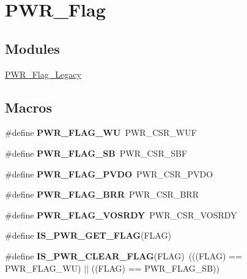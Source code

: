 \hypertarget{group___p_w_r___flag}{\section{P\-W\-R\-\_\-\-Flag}
\label{group___p_w_r___flag}
}
\subsection*{Modules}
\begin{DoxyCompactItemize}
\item 
\hyperlink{group___p_w_r___flag___legacy}{P\-W\-R\-\_\-\-Flag\-\_\-\-Legacy}
\end{DoxyCompactItemize}
\subsection*{Macros}
\begin{DoxyCompactItemize}
\item 
\hypertarget{group___p_w_r___flag_ga2d06760a5769e729b06d41e37036d58e}{\#define {\bfseries P\-W\-R\-\_\-\-F\-L\-A\-G\-\_\-\-W\-U}~P\-W\-R\-\_\-\-C\-S\-R\-\_\-\-W\-U\-F}\label{group___p_w_r___flag_ga2d06760a5769e729b06d41e37036d58e}

\item 
\hypertarget{group___p_w_r___flag_ga9e55f0b5dec2346d5c8dee3ab3c0c2df}{\#define {\bfseries P\-W\-R\-\_\-\-F\-L\-A\-G\-\_\-\-S\-B}~P\-W\-R\-\_\-\-C\-S\-R\-\_\-\-S\-B\-F}\label{group___p_w_r___flag_ga9e55f0b5dec2346d5c8dee3ab3c0c2df}

\item 
\hypertarget{group___p_w_r___flag_gaefd05d58cc050eeef83a1b5c520b2c2a}{\#define {\bfseries P\-W\-R\-\_\-\-F\-L\-A\-G\-\_\-\-P\-V\-D\-O}~P\-W\-R\-\_\-\-C\-S\-R\-\_\-\-P\-V\-D\-O}\label{group___p_w_r___flag_gaefd05d58cc050eeef83a1b5c520b2c2a}

\item 
\hypertarget{group___p_w_r___flag_ga4d4937c0a493bc2ff70e7e66c301c191}{\#define {\bfseries P\-W\-R\-\_\-\-F\-L\-A\-G\-\_\-\-B\-R\-R}~P\-W\-R\-\_\-\-C\-S\-R\-\_\-\-B\-R\-R}\label{group___p_w_r___flag_ga4d4937c0a493bc2ff70e7e66c301c191}

\item 
\hypertarget{group___p_w_r___flag_ga7c0f807d7e91750a9bb571ca94dc5f71}{\#define {\bfseries P\-W\-R\-\_\-\-F\-L\-A\-G\-\_\-\-V\-O\-S\-R\-D\-Y}~P\-W\-R\-\_\-\-C\-S\-R\-\_\-\-V\-O\-S\-R\-D\-Y}\label{group___p_w_r___flag_ga7c0f807d7e91750a9bb571ca94dc5f71}

\item 
\#define {\bfseries I\-S\-\_\-\-P\-W\-R\-\_\-\-G\-E\-T\-\_\-\-F\-L\-A\-G}(F\-L\-A\-G)
\item 
\hypertarget{group___p_w_r___flag_ga36d35a770e683e4a0baf3aac350fcb5a}{\#define {\bfseries I\-S\-\_\-\-P\-W\-R\-\_\-\-C\-L\-E\-A\-R\-\_\-\-F\-L\-A\-G}(F\-L\-A\-G)~(((F\-L\-A\-G) == P\-W\-R\-\_\-\-F\-L\-A\-G\-\_\-\-W\-U) $|$$|$ ((F\-L\-A\-G) == P\-W\-R\-\_\-\-F\-L\-A\-G\-\_\-\-S\-B))}\label{group___p_w_r___flag_ga36d35a770e683e4a0baf3aac350fcb5a}

\end{DoxyCompactItemize}


